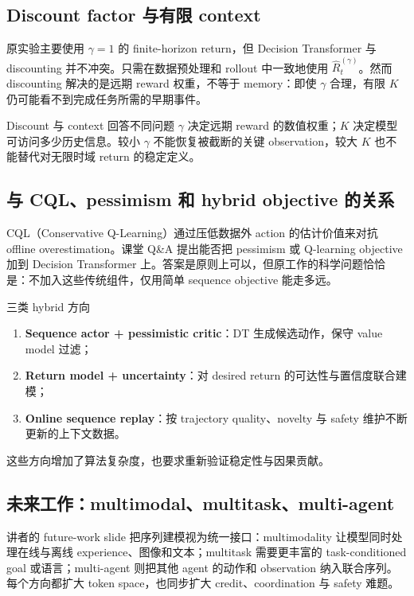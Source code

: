 \documentclass[a4paper]{article}
\begin{document}
\subsection{Discount factor 与有限 context}

原实验主要使用 $\gamma=1$ 的 finite-horizon return，但 Decision Transformer 与 discounting 并不冲突。只需在数据预处理和 rollout 中一致地使用 $\widehat{R}^{(\gamma)}_t$。然而 discounting 解决的是远期 reward 权重，不等于 memory：即使 $\gamma$ 合理，有限 $K$ 仍可能看不到完成任务所需的早期事件。

\begin{importantbox}{Discount 与 context 回答不同问题}
$\gamma$ 决定远期 reward 的数值权重；$K$ 决定模型可访问多少历史信息。较小 $\gamma$ 不能恢复被截断的关键 observation，较大 $K$ 也不能替代对无限时域 return 的稳定定义。
\end{importantbox}

\subsection{与 CQL、pessimism 和 hybrid objective 的关系}

CQL（Conservative Q-Learning）通过压低数据外 action 的估计价值来对抗 offline overestimation。课堂 Q\&A 提出能否把 pessimism 或 Q-learning objective 加到 Decision Transformer 上。答案是原则上可以，但原工作的科学问题恰恰是：不加入这些传统组件，仅用简单 sequence objective 能走多远。

\begin{knowledgebox}{三类 hybrid 方向}
\begin{enumerate}
  \item \textbf{Sequence actor + pessimistic critic}：DT 生成候选动作，保守 value model 过滤；
  \item \textbf{Return model + uncertainty}：对 desired return 的可达性与置信度联合建模；
  \item \textbf{Online sequence replay}：按 trajectory quality、novelty 与 safety 维护不断更新的上下文数据。
\end{enumerate}
这些方向增加了算法复杂度，也要求重新验证稳定性与因果贡献。
\end{knowledgebox}

\subsection{未来工作：multimodal、multitask、multi-agent}

讲者的 future-work slide 把序列建模视为统一接口：multimodality 让模型同时处理在线与离线 experience、图像和文本；multitask 需要更丰富的 task-conditioned goal 或语言；multi-agent 则把其他 agent 的动作和 observation 纳入联合序列。每个方向都扩大 token space，也同步扩大 credit、coordination 与 safety 难题。
\end{document}
